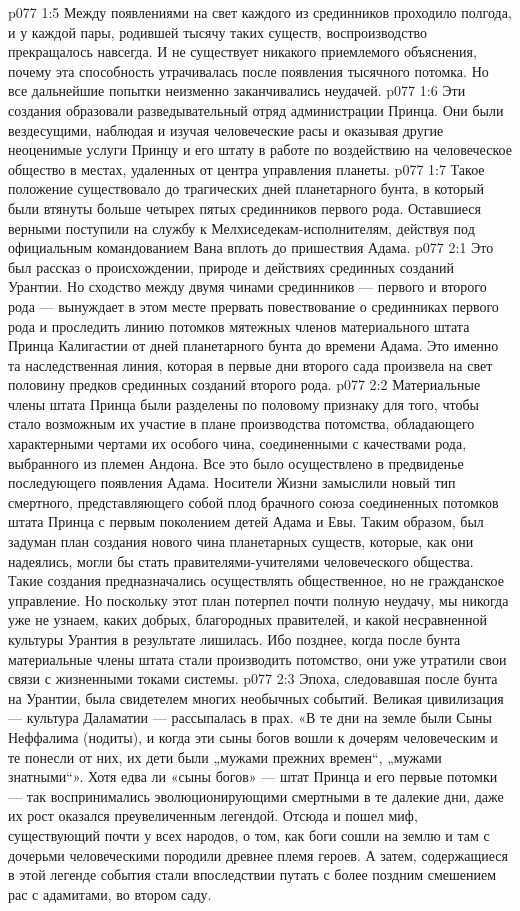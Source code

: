 \vs p077 1:5 Между появлениями на свет каждого из срединников проходило полгода, и у каждой пары, родившей тысячу таких существ, воспроизводство прекращалось навсегда. И не существует никакого приемлемого объяснения, почему эта способность утрачивалась после появления тысячного потомка. Но все дальнейшие попытки неизменно заканчивались неудачей.
\vs p077 1:6 \pc Эти создания образовали разведывательный отряд администрации Принца. Они были вездесущими, наблюдая и изучая человеческие расы и оказывая другие неоценимые услуги Принцу и его штату в работе по воздействию на человеческое общество в местах, удаленных от центра управления планеты.
\vs p077 1:7 Такое положение существовало до трагических дней планетарного бунта, в который были втянуты больше четырех пятых срединников первого рода. Оставшиеся верными поступили на службу к Мелхиседекам\hyp{}исполнителям, действуя под официальным командованием Вана вплоть до пришествия Адама.
\vs p077 2:1 Это был рассказ о происхождении, природе и действиях срединных созданий Урантии. Но сходство между двумя чинами срединников --- первого и второго рода --- вынуждает в этом месте прервать повествование о срединниках первого рода и проследить линию потомков мятежных членов материального штата Принца Калигастии от дней планетарного бунта до времени Адама. Это именно та наследственная линия, которая в первые дни второго сада произвела на свет половину предков срединных созданий второго рода.
\vs p077 2:2 \pc Материальные члены штата Принца были разделены по половому признаку для того, чтобы стало возможным их участие в плане производства потомства, обладающего характерными чертами их особого чина, соединенными с качествами рода, выбранного из племен Андона. Все это было осуществлено в предвиденье последующего появления Адама. Носители Жизни замыслили новый тип смертного, представляющего собой плод брачного союза соединенных потомков штата Принца с первым поколением детей Адама и Евы. Таким образом, был задуман план создания нового чина планетарных существ, которые, как они надеялись, могли бы стать правителями\hyp{}учителями человеческого общества. Такие создания предназначались осуществлять общественное, но не гражданское управление. Но поскольку этот план потерпел почти полную неудачу, мы никогда уже не узнаем, каких добрых, благородных правителей, и какой несравненной культуры Урантия в результате лишилась. Ибо позднее, когда после бунта материальные члены штата стали производить потомство, они уже утратили свои связи с жизненными токами системы.
\vs p077 2:3 Эпоха, следовавшая после бунта на Урантии, была свидетелем многих необычных событий. Великая цивилизация --- культура Даламатии --- рассыпалась в прах. «В те дни на земле были Сыны Неффалима (нодиты), и когда эти сыны богов вошли к дочерям человеческим и те понесли от них, их дети были „мужами прежних времен“, „мужами знатными“». Хотя едва ли «сыны богов» --- штат Принца и его первые потомки --- так воспринимались эволюционирующими смертными в те далекие дни, даже их рост оказался преувеличенным легендой. Отсюда и пошел миф, существующий почти у всех народов, о том, как боги сошли на землю и там с дочерьми человеческими породили древнее племя героев. А затем, содержащиеся в этой легенде события стали впоследствии путать с более поздним смешением рас с адамитами, во втором саду.
